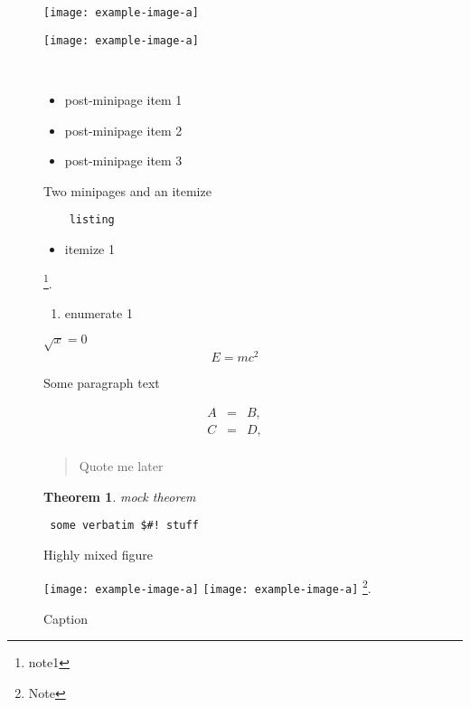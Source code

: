 \documentclass{article}
\newtheorem{theorem}{Theorem}
\begin{document}
\begin{figure}
  \begin{minipage}[t]{0.4\textwidth}
    \texttt{[image: example-image-a]}
  \end{minipage}
  \begin{minipage}[t]{0.4\textwidth}
    \texttt{[image: example-image-a]}
  \end{minipage} \\
  \begin{center}\begin{itemize}
    \item post-minipage item 1
    \item post-minipage item 2
    \item post-minipage item 3
  \end{itemize}\end{center}
  \caption{Two minipages and an itemize}
\end{figure}
\clearpage

\begin{figure}
  \begin{lstlisting}
    listing
  \end{lstlisting}%
  \begin{itemize}\item itemize 1 \end{itemize}\footnote{note1}.%
  \begin{enumerate}\item enumerate 1 \end{enumerate}%
  $ \sqrt{x} = 0 $%
  \[ E = mc^2 \]%

  Some paragraph text

  \begin{eqnarray*}
    A&=&B,\\
    C&=&D,\\
  \end{eqnarray*}
  \begin{quote}Quote me later\end{quote}%
  \begin{theorem} mock theorem \end{theorem}%
  \begin{verbatim} some verbatim $#! stuff \end{verbatim}%
  \caption{Highly mixed figure}
\end{figure}
\clearpage

\begin{figure}
  \texttt{[image: example-image-a]}\hspace{2cm}%
  \texttt{[image: example-image-a]}%
  \footnote{Note}.
  \caption{Caption}
\end{figure}
\clearpage
\end{document}
